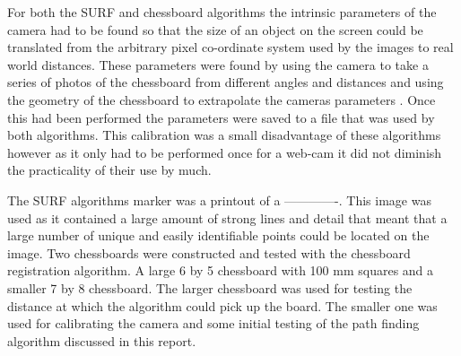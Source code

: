 For both the SURF and chessboard algorithms the intrinsic parameters of the camera had to be found so that the size of an object on the screen could be translated from the arbitrary pixel co-ordinate system used by the images to real world distances. These parameters were found by using the camera to take a series of photos of the chessboard from different angles and distances and using the geometry of the chessboard to extrapolate the cameras parameters \cite{calibrate}. Once this had been performed the parameters were saved to a file that was used by both algorithms. This calibration was a small disadvantage of these algorithms however as it only had to be performed once for a web-cam it did not diminish the practicality of their use by much.

The SURF algorithms marker was a printout of a -------------. This image was used as it contained a large amount of strong lines and detail that meant that a large number of unique and easily identifiable points could be located on the image. Two chessboards were constructed and tested with the chessboard registration algorithm. A large 6 by 5 chessboard with 100 mm squares and a smaller 7 by 8 chessboard. The larger chessboard was used for testing the distance at which the algorithm could pick up the board. The smaller one was used for calibrating the camera and some initial testing of the path finding algorithm discussed in this report. 